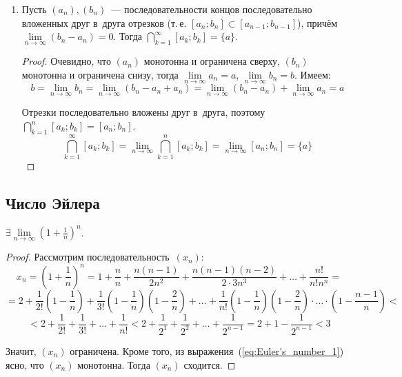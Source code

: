 \begin{enumerate}
	\item \begin{lemma}
	\label{lemma:about_nested_intervals}
	Пусть $(a_n), (b_n)$~--- последовательности концов последовательно вложенных друг в~друга отрезков (т.\,е. $[a_n; b_n] \subset [a_{n-1}; b_{n-1}]$), причём $\lim\limits_{n \to \infty} (b_n - a_n) = 0$.
	Тогда $\bigcap\limits_{k=1}^\infty [a_k; b_k] = \{ a \}$.
	\end{lemma}
	\begin{proof}
	Очевидно, что $(a_n)$ монотонна и ограничена сверху, $(b_n)$ монотонна и ограничена снизу, тогда $\lim\limits_{n \to \infty} a_n = a$, $\lim\limits_{n \to \infty} b_n = b$.
	Имеем:
	\begin{equation*}
	b = \lim_{n \to \infty} b_n = \lim_{n \to \infty} (b_n - a_n + a_n) = \lim_{n \to \infty} (b_n - a_n) + \lim_{n \to \infty} a_n = a
	\end{equation*}
	
	Отрезки последовательно вложены друг в~друга, поэтому $\bigcap\limits_{k=1}^n [a_k; b_k] = [a_n; b_n]$.
	\begin{equation*}
	\bigcap_{k=1}^\infty [a_k; b_k] = \lim_{n \to \infty} \bigcap_{k=1}^n [a_k; b_k] = \lim_{n \to \infty} [a_n; b_n] = \{ a \}
	\end{equation*}
	\end{proof}
\end{enumerate}

\subsection{Число Эйлера}
\begin{statement}
$\exists \lim\limits_{n \to \infty} \left( 1 + \frac1n \right)^n$.
\end{statement}
\begin{proof}
Рассмотрим последовательность~$(x_n) \colon$
\begin{equation*}
x_n = \left( 1 + \frac1n \right)^n = 1 + \frac{n}n + \frac{n(n - 1)}{2n^2} + \frac{n(n - 1)(n - 2)}{2 \cdot 3n^3} + \ldots + \frac{n!}{n!n^n} =
\end{equation*}
\begin{equation}
\label{eq:Euler's_number_1}
= 2 + \frac1{2!} \left( 1 - \frac1n \right) + \frac1{3!} \left( 1 - \frac1n \right) \left( 1 - \frac2n \right) + \ldots + \frac1{n!} \left( 1 - \frac1n \right) \left( 1 - \frac2n \right) \cdot \ldots \cdot \left( 1 - \frac{n - 1}n \right) <
\end{equation}
\begin{equation*}
< 2 + \frac1{2!} + \frac1{3!} + \ldots + \frac1{n!} < 2 + \frac1{2^1} + \frac1{2^2} + \ldots + \frac1{2^{n-1}} = 2 + 1 - \frac1{2^{n-1}} < 3
\end{equation*}

Значит, $(x_n)$ ограничена.
Кроме того, из выражения~(\ref*{eq:Euler's_number_1}) ясно, что $(x_n)$ монотонна.
Тогда $(x_n)$ сходится.
\end{proof}

